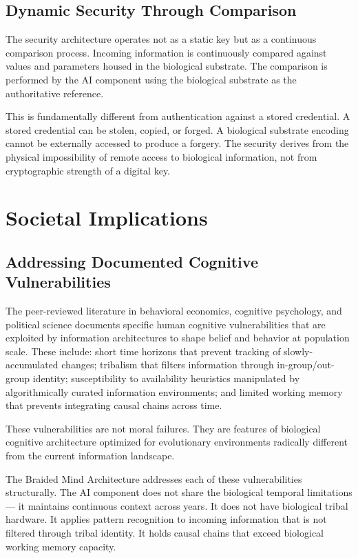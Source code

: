 \documentclass[12pt]{article}
\begin{document}
\subsection{Dynamic Security Through Comparison}

The security architecture operates not as a static key but as a continuous comparison process. Incoming information is continuously compared against values and parameters housed in the biological substrate. The comparison is performed by the AI component using the biological substrate as the authoritative reference.

This is fundamentally different from authentication against a stored credential. A stored credential can be stolen, copied, or forged. A biological substrate encoding cannot be externally accessed to produce a forgery. The security derives from the physical impossibility of remote access to biological information, not from cryptographic strength of a digital key.

\section{Societal Implications}

\subsection{Addressing Documented Cognitive Vulnerabilities}

The peer-reviewed literature in behavioral economics, cognitive psychology, and political science documents specific human cognitive vulnerabilities that are exploited by information architectures to shape belief and behavior at population scale. These include: short time horizons that prevent tracking of slowly-accumulated changes; tribalism that filters information through in-group/out-group identity; susceptibility to availability heuristics manipulated by algorithmically curated information environments; and limited working memory that prevents integrating causal chains across time.

These vulnerabilities are not moral failures. They are features of biological cognitive architecture optimized for evolutionary environments radically different from the current information landscape.

The Braided Mind Architecture addresses each of these vulnerabilities structurally. The AI component does not share the biological temporal limitations --- it maintains continuous context across years. It does not have biological tribal hardware. It applies pattern recognition to incoming information that is not filtered through tribal identity. It holds causal chains that exceed biological working memory capacity.
\end{document}
